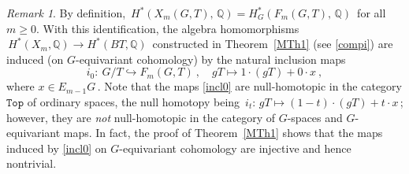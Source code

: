\documentclass[11pt]{amsart}
\newtheorem{cor}[theorem]{Corollary}
\theoremstyle{definition}
\theoremstyle{remark}
\newtheorem{remark}[theorem]{Remark}
\numberwithin{equation}{section}
\newcommand{\la}{\label}
\newcommand{\into}{\hookrightarrow}
\newcommand{\Top}{\mathtt{Top}}
\def\Q{\mathbb{Q}}
\begin{document}
\begin{remark}
\la{rem11}
By definition, $\, H^*(X_m(G,T),\, \Q) = H^*_{G}(F_m(G,T),\, \Q) \,$ for all $ m \ge 0 $.
With this identification, the algebra homomorphisms $\,H^*(X_m, \Q) \to H^*(BT, \Q)\,$ constructed in Theorem~\ref{MTh1} (see \eqref{compi}) are induced (on $G$-equivariant cohomology) by the natural inclusion maps 
%
\begin{equation}
\la{incl0}
i_0:\ G/T \into F_m(G,T)\ ,\quad 
gT \mapsto 1 \cdot (gT) + 0 \cdot x \ , 
\end{equation}
%
where $ x \in E_{m-1}G\,$. Note that the maps \eqref{incl0} are null-homotopic in the category $\Top$ of ordinary spaces, 
the null homotopy being $\, i_t:\, gT \mapsto (1-t) \cdot (gT) + t \cdot x \,$; however, they are {\it not} null-homotopic 
in the category of $G$-spaces and $G$-equivariant maps. In fact, the proof of Theorem~\ref{MTh1} shows that the maps
induced by \eqref{incl0} on $G$-equivariant cohomology are injective and hence nontrivial.
\end{remark}
%

\end{document}
